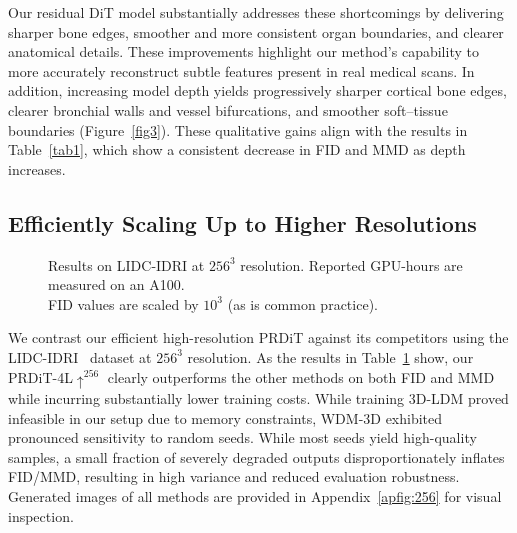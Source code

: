 Our residual DiT model substantially addresses these shortcomings by delivering sharper bone edges, smoother and more consistent organ boundaries, and clearer anatomical details. These improvements highlight our method's capability to more accurately reconstruct subtle features present in real medical scans.
In addition, increasing model depth yields progressively sharper cortical bone edges, clearer bronchial walls and vessel bifurcations, and smoother soft–tissue boundaries (Figure~\ref{fig3}). These qualitative gains align with the results in Table~\ref{tab1}, which show a consistent decrease in FID and MMD as depth increases. 

\subsection{Efficiently Scaling Up to Higher Resolutions}
\begin{figure}
\vspace{-25pt}
\begin{minipage}{0.54\textwidth}
\begin{table}[H]
\begin{center}
\caption{Results on LIDC-IDRI at $256^3$ resolution. Reported GPU-hours are measured on an A100.\\ FID values are scaled by $10^{3}$ (as is common practice).}
\vspace{-3pt}
  \centering
  \label{tab:lidc256}
\end{center}
\end{table}
\end{minipage}
\end{figure}
We contrast our efficient high-resolution PRDiT against its competitors using the LIDC\mbox{-}IDRI~\citep{armato2011lung} dataset at $256^3$ resolution. As the results in Table~\ref{tab:lidc256} show, our PRDiT-4L$\uparrow^{256}$ clearly outperforms the other methods on both FID and MMD while incurring substantially lower training costs. While training 3D\mbox{-}LDM proved infeasible in our setup due to memory constraints, WDM\mbox{-}3D exhibited pronounced sensitivity to random seeds. While most seeds yield high-quality samples, a small fraction of severely degraded outputs disproportionately inflates FID/MMD, resulting in high variance and reduced evaluation robustness. Generated images of all methods are provided in Appendix~\ref{apfig:256} for visual inspection. 

